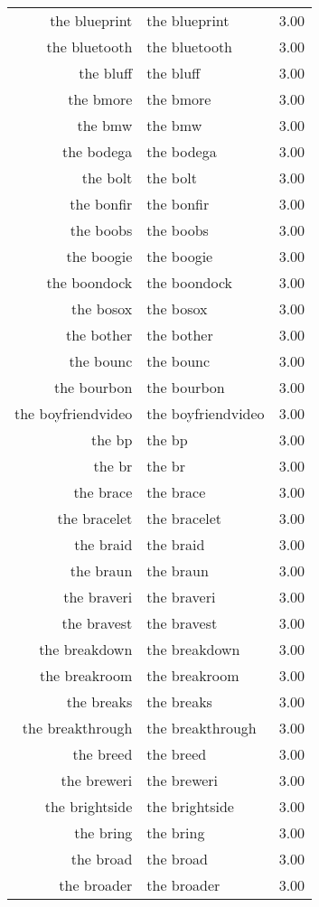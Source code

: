 \begin{table}[ht]
\begin{tabular}{rlr}
  the blueprint & the blueprint & 3.00 \\ 
  the bluetooth & the bluetooth & 3.00 \\ 
  the bluff & the bluff & 3.00 \\ 
  the bmore & the bmore & 3.00 \\ 
  the bmw & the bmw & 3.00 \\ 
  the bodega & the bodega & 3.00 \\ 
  the bolt & the bolt & 3.00 \\ 
  the bonfir & the bonfir & 3.00 \\ 
  the boobs & the boobs & 3.00 \\ 
  the boogie & the boogie & 3.00 \\ 
  the boondock & the boondock & 3.00 \\ 
  the bosox & the bosox & 3.00 \\ 
  the bother & the bother & 3.00 \\ 
  the bounc & the bounc & 3.00 \\ 
  the bourbon & the bourbon & 3.00 \\ 
  the boyfriendvideo & the boyfriendvideo & 3.00 \\ 
  the bp & the bp & 3.00 \\ 
  the br & the br & 3.00 \\ 
  the brace & the brace & 3.00 \\ 
  the bracelet & the bracelet & 3.00 \\ 
  the braid & the braid & 3.00 \\ 
  the braun & the braun & 3.00 \\ 
  the braveri & the braveri & 3.00 \\ 
  the bravest & the bravest & 3.00 \\ 
  the breakdown & the breakdown & 3.00 \\ 
  the breakroom & the breakroom & 3.00 \\ 
  the breaks & the breaks & 3.00 \\ 
  the breakthrough & the breakthrough & 3.00 \\ 
  the breed & the breed & 3.00 \\ 
  the breweri & the breweri & 3.00 \\ 
  the brightside & the brightside & 3.00 \\ 
  the bring & the bring & 3.00 \\ 
  the broad & the broad & 3.00 \\ 
  the broader & the broader & 3.00 \\ 

\end{tabular}
\end{table}
